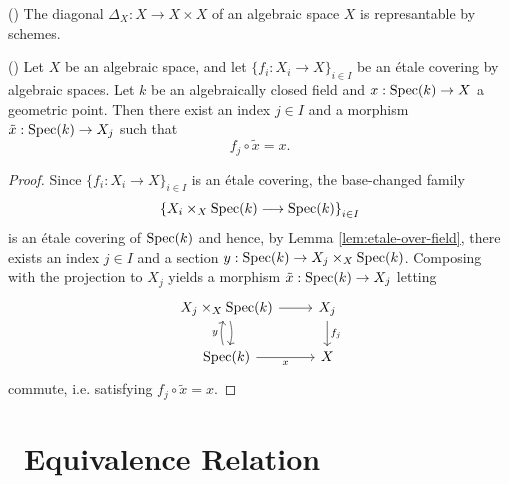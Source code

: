 \begin{theorem}
	(\cite[][(Theorem 4.2.1), p.~118]{alper2026stacks})
	The diagonal $\Delta_X: X\to X\times X$ of an algebraic space $X$ is represantable by schemes.
\end{theorem}

\begin{lemma}\label{lem:geometric-points-etale-cover}
	(\cite[][Tag 05VN]{stacks-project})
	Let $X$ be an algebraic space, and let
	$\{f_i : X_i \to X\}_{i\in I}$ be an étale covering by algebraic
	spaces. Let $k$ be an algebraically closed field and
	$x : \operatorname{Spec}(k) \to X$ a geometric point. Then there exist an
	index $j\in I$ and a morphism
	$\tilde{x} : \operatorname{Spec}(k) \to X_j$ such that
	\[
	f_j\circ \tilde{x} = x.
	\]
\end{lemma}

\begin{proof}
	Since $\{f_i : X_i \to X\}_{i\in I}$ is an étale covering,
	the base-changed family
	\[
	\left\{
	X_i \times_X \operatorname{Spec}(k)
	\longrightarrow \operatorname{Spec}(k)
	\right\}_{i\in I}
	\]
	is an étale covering of $\operatorname{Spec}(k)$ and hence, by Lemma \ref{lem:etale-over-field}, there exists an index $j\in I$ and a section $y: \operatorname{Spec}\!\left(k\right) \to X_j\times_X \operatorname{Spec}\!\left(k\right)$.
	Composing with the projection to $X_j$ yields a morphism
	$\tilde{x}:\operatorname{Spec}(k)\to X_j$ letting 
	\[
	\begin{tikzcd}
		X_j \times_X \operatorname{Spec}(k)
		\arrow[r]
		\arrow[d, bend left=15]
		& X_j \arrow[d, "f_j"] \\
		\operatorname{Spec}(k)
		\arrow[u, "y", bend left=15]
		\arrow[r, "x"']
		& X
	\end{tikzcd}
	\]
	commute, i.e. satisfying $f_j\circ\tilde{x}=x$.
\end{proof}

\section{\Etale\ Equivalence Relation}

